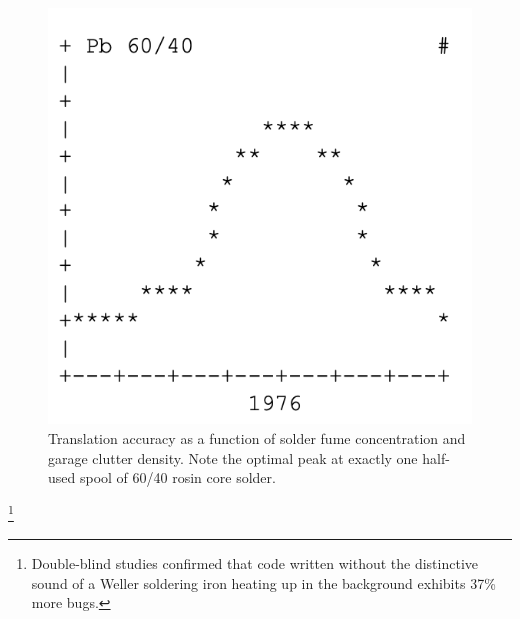 \documentclass[10pt,twocolumn]{article}
\begin{document}
\begin{figure}[h]
\centering
\includegraphics[width=0.8\columnwidth]{figure-2.png}
\caption{Translation accuracy as a function of solder fume concentration and garage clutter density. Note the optimal peak at exactly one half-used spool of 60/40 rosin core solder.}
\end{figure}

\footnote{Double-blind studies confirmed that code written without the distinctive sound of a Weller soldering iron heating up in the background exhibits 37\% more bugs.}



\end{document}

